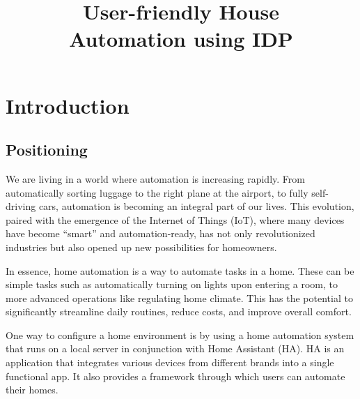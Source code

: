 \documentclass[11pt,a4paper]{report}
\title{User-friendly House\\ Automation using IDP}
\subtitle{}
\begin{document}
\preface%

\printnoidxglossary[type=\acronymtype]%
\clearpage

%
%
%





\chapter{Introduction}
\section{Positioning}
We are living in a world where automation is increasing rapidly. From automatically sorting luggage to the right plane at the airport, to fully self-driving cars, automation is becoming an integral part of our lives. This evolution, paired with the emergence of the Internet of Things (IoT), where many devices have become ``smart'' and automation-ready, has not only revolutionized industries but also opened up new possibilities for homeowners.

In essence, home automation is a way to automate tasks in a home. These can be simple tasks such as automatically turning on lights upon entering a room, to more advanced operations like regulating home climate. This has the potential to significantly streamline daily routines, reduce costs, and improve overall comfort.

One way to configure a home environment is by using a home automation system that runs on a local server in conjunction with Home Assistant (HA). HA is an application that integrates various devices from different brands into a single functional app. It also provides a framework through which users can automate their homes.
\end{document}
